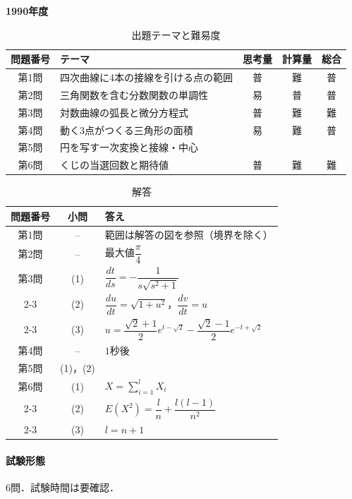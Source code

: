 \documentclass[../../main.tex]{subfiles}
\begin{document}
\begin{center}
  {\fontsize{48pt}{58pt}\selectfont \textbf{1990}\normalsize\textbf{年度}}
\end{center}

\begin{table}[htb]
  \centering
  \caption{出題テーマと難易度}
  \begin{tabular}{|c|p{6.2cm}|c|c|c|}
    \hline
    \textbf{問題番号} & \textbf{テーマ} & \textbf{思考量} & \textbf{計算量} & \textbf{総合} \\
    \hline
    第1問 & 四次曲線に4本の接線を引ける点の範囲 & 普 & 難 & 普 \\
    \hline
    第2問 & 三角関数を含む分数関数の単調性 & 易 & 普 & 普 \\
    \hline
    第3問 & 対数曲線の弧長と微分方程式 & 普 & 難 & 難 \\
    \hline
    第4問 & 動く3点がつくる三角形の面積 & 易 & 難 & 普 \\
    \hline
    第5問 & 円を写す一次変換と接線・中心 &  &  &  \\
    \hline
    第6問 & くじの当選回数と期待値 & 普 & 難 & 難 \\
    \hline
  \end{tabular}
\end{table}

\begin{table}[htb]
  \centering
  \caption{解答}
  \renewcommand{\arraystretch}{1.4}
  \begin{tabular}{|c|c|p{9cm}|}
    \hline
    \textbf{問題番号} & \textbf{小問} & \textbf{答え} \\
    \hline
    第1問 & -- & 範囲は解答の図を参照（境界を除く） \\
    \hline
    第2問 & -- & 最大値$\dfrac{\pi}{4}$ \\
    \hline
    第3問 & (1) & $\dfrac{dt}{ds}=-\dfrac{1}{s\sqrt{s^2+1}}$ \\
    \cline{2-3}
    & (2) & $\dfrac{du}{dt}=\sqrt{1+u^2}$，$\dfrac{dv}{dt}=u$ \\
    \cline{2-3}
    & (3) & $u=\dfrac{\sqrt{2}+1}{2}e^{t-\sqrt{2}}-\dfrac{\sqrt{2}-1}{2}e^{-t+\sqrt{2}}$ \\
    \hline
    第4問 & -- & $1$秒後 \\
    \hline
    第5問 & (1)，(2) &  \\
    \hline
    第6問 & (1) & $X=\sum_{i=1}^{l}X_i$ \\
    \cline{2-3}
    & (2) & $E(X^2)=\dfrac{l}{n}+\dfrac{l(l-1)}{n^2}$ \\
    \cline{2-3}
    & (3) & $l=n+1$ \\
    \hline
  \end{tabular}
\end{table}

\paragraph{試験形態}
6問．試験時間は要確認．
\end{document}
